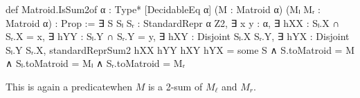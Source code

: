 \begin{leancode}
def Matroid.IsSum2of {α : Type*} [DecidableEq α]
    (M : Matroid α) (Mₗ Mᵣ : Matroid α) :
    Prop :=
  ∃ S Sₗ Sᵣ : StandardRepr α Z2,
  ∃ x y : α,
  ∃ hXX : Sₗ.X ∩ Sᵣ.X = {x},
  ∃ hYY : Sₗ.Y ∩ Sᵣ.Y = {y},
  ∃ hXY : Disjoint Sₗ.X Sᵣ.Y,
  ∃ hYX : Disjoint Sₗ.Y Sᵣ.X,
  standardReprSum2 hXX hYY hXY hYX = some S
  ∧ S.toMatroid = M
  ∧ Sₗ.toMatroid = Mₗ
  ∧ Sᵣ.toMatroid = Mᵣ
\end{leancode}
This is again a predicate\EmDash when $M$ is a 2-sum of $M_{\ell}$ and $M_{r}$.
